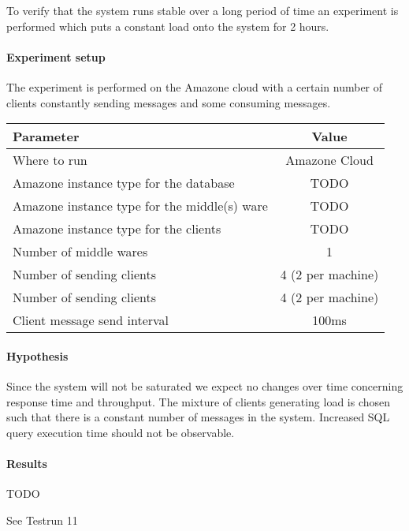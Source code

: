 \documentclass[milestone1.tex]{subfiles}
\begin{document}

To verify that the system runs stable over a long period of time an experiment is performed which puts a constant load onto the system for 2 hours.

\paragraph{Experiment setup}
The experiment is performed on the Amazone cloud with a certain number of clients constantly sending messages and some consuming messages. 

\begin{tabular}{|l|c|}
\hline 
Parameter & Value \\
\hline 
Where to run & Amazone Cloud \\ 
Amazone instance type for the database & TODO \\ 
Amazone instance type for the middle(s) ware& TODO \\ 
Amazone instance type for the clients & TODO \\ 
Number of middle wares & 1 \\ 
Number of sending clients & 4 (2 per machine) \\ 
Number of sending clients & 4 (2 per machine) \\ 
Client message send interval & 100ms \\
\hline 
\end{tabular}

\paragraph{Hypothesis}
Since the system will not be saturated we expect no changes over time concerning response time and throughput. The mixture of clients generating load is chosen such that there is a constant number of messages in the system. Increased SQL query execution time should not be observable.

\paragraph{Results}

TODO

See Testrun 11

\end{document}
